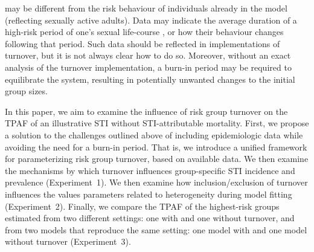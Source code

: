 may be different from the risk behaviour
of individuals already in the model (reflecting sexually active adults). %
Data may indicate the average duration
of a high-risk period of one's sexual life-course \citep{Watts2010}, %
or how their behaviour changes following that period. %
Such data should be reflected in implementations of turnover,
but it is not always clear how to do so.
Moreover, without an exact analysis of the turnover implementation,
a burn-in period may be required to equilibrate the system,
resulting in potentially unwanted changes to the initial group sizes.
\par
In this paper, we aim to examine the influence of risk group turnover
on the TPAF of an illustrative STI without STI-attributable mortality.
First, we propose a solution to the challenges outlined above
of including epidemiologic data while avoiding the need for a burn-in period.
That is, we introduce a unified framework for
parameterizing risk group turnover, based on available data.
We then examine the mechanisms by which turnover
influences group-specific STI incidence and prevalence
(Experiment~1).
We then examine how inclusion/exclusion of turnover influences
the values parameters related to heterogeneity during model fitting
(Experiment~2).
Finally, we compare the TPAF of the highest-risk groups estimated
from two different settings: one with and one without turnover,
and from two models that reproduce the same setting:
one model with and one model without turnover
(Experiment~3).